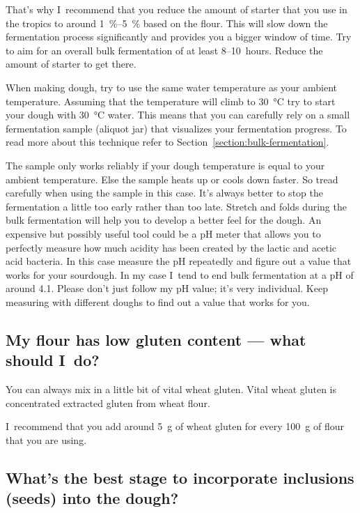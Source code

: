 That's why I~recommend that you reduce the amount of starter
that you use in the tropics to around \qtyrange{1}{5}{\percent}
based on the flour. This will slow down the fermentation
process significantly and provides you a bigger window
of time. Try to aim for an overall bulk fermentation of at
least 8--10~hours. Reduce the amount of starter to get there.

When making dough, try to use the same water temperature
as your ambient temperature. Assuming that the temperature
will climb to \qty{30}{\degreeCelsius} try to start your dough
with \qty{30}{\degreeCelsius} water. This means that you can carefully rely on
a small fermentation sample (aliquot jar) that visualizes your fermentation
progress. To read more about this technique refer
to Section~\ref{section:bulk-fermentation}.

The sample only works reliably if your dough temperature
is equal to your ambient temperature. Else the sample heats
up or cools down faster. So tread carefully when using
the sample in this case. It's always better to stop
the fermentation a little too early rather than too late.
Stretch and folds during the bulk fermentation
will help you to develop a better feel for
the dough. An expensive but possibly useful tool
could be a pH meter that allows you to perfectly
measure how much acidity has been created by the
lactic and acetic acid bacteria. In this case measure
the pH repeatedly and figure out a value that works
for your sourdough. In my case I~tend to end bulk
fermentation at a pH of around 4.1. Please don't just
follow my pH value; it's very individual. Keep measuring
with different doughs to find out a value that works for you.

\subsection{My flour has low gluten content --- what should I~do?}

You can always mix in a little bit of vital wheat gluten. Vital wheat gluten
is concentrated extracted gluten from wheat flour.

I~recommend that you add around \qty{5}{\gram} of wheat gluten for every
\qty{100}{\gram} of flour that you are using.

\subsection[Incorporating seeds into the dough]{What's the best stage to
incorporate inclusions (seeds) into the dough?}

